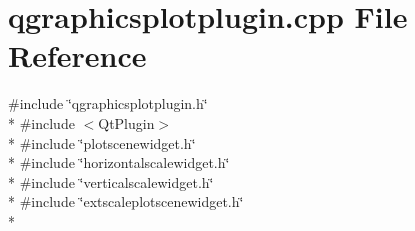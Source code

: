 \section{qgraphicsplotplugin.\+cpp File Reference}
\label{bk3_2plugins_2qgraphicsplotplugin_8cpp}
{\ttfamily \#include \char`\"{}qgraphicsplotplugin.\+h\char`\"{}}\\*
{\ttfamily \#include $<$Qt\+Plugin$>$}\\*
{\ttfamily \#include \char`\"{}plotscenewidget.\+h\char`\"{}}\\*
{\ttfamily \#include \char`\"{}horizontalscalewidget.\+h\char`\"{}}\\*
{\ttfamily \#include \char`\"{}verticalscalewidget.\+h\char`\"{}}\\*
{\ttfamily \#include \char`\"{}extscaleplotscenewidget.\+h\char`\"{}}\\*

